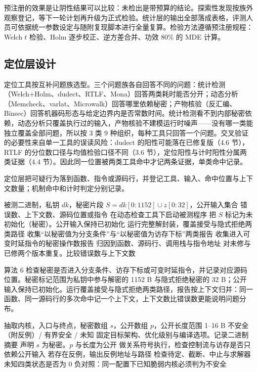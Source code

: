 预注册的效果是让阴性结果可以比较：未检出是带预算的结论。探索性发现按族外观察登记，等下一轮计划再升级为正式检验。统计层的输出全部落成表格，评测人员可依据统一参数设定与随附复现脚本进行全量复算。检验方法遵循预注册规程：Welch $t$ 检验、Holm 逐步校正、逆方差合并、功效 80\% 的 MDE 计算。

\subsection{定位层设计}

定位工具按互补问题族选型。三个问题族各自回答不同的问题：统计检测（Welch+Holm、dudect、RTLF、Mona）回答两类耗时能否分开；动态分析（Memcheck、varlat、Microwalk）回答哪里依赖秘密；产物核验（反汇编、Binsec）回答机器码形态与给定边界内是否常数时间。统计检测看不到内部秘密依赖，动态分析只覆盖执行过的输入，产物核验不建模运行时噪声——没有哪一类能独立覆盖全部问题，所以按 3 类 9 种组织，每种工具只回答一个问题。交叉验证的必要性来自单一工具的误读风险：dudect 的阳性可能落在已修复版（4.6 节），RTLF 的分位数口径与均值检验口径不同（3.6 节），定位阳性与计时阳性分属两类证据（4.4 节）。因此同一位置被两类工具命中才记两条证据，单类命中记录。

定位层把可疑行为落到函数、指令或源码行，并登记工具、输入、命中位置与上下文数量；机制命中和计时判定分别记录。

\begin{algorithm}[H]
\caption{秘密标记动态检查}
\label{alg:memcheck}
\begin{algorithmic}[1]
\Require 被测二进制，私钥 $dk$，秘密片段 $S=dk[0{:}1152]\cup z[0{:}32]$，公开输入集合
\Ensure 错误数、上下文数、源码位置或指令
\State 在动态检查工具下启动被测程序
\State 把 $S$ 标记为未初始化（秘密）。公开输入保持已初始化
\State 运行完整解封装，覆盖接受与隐式拒绝两类路径
\State 收集“以秘密值为分支条件”与“以秘密值为访存下标”两类报告
\State 收集进入可变时延指令的秘密操作数报告
\State 归因到函数、源码行、调用栈与指令地址
\State 对未修与已修两个版本重复。比较错误数与上下文数
\end{algorithmic}
\end{algorithm}

算法 6 检查秘密是否进入分支条件、访存下标或可变时延指令，并记录对应源码位置。秘密标记范围为私钥中参与解密的 1152 B 与隐式拒绝秘密的 32 B；公开输入保持已初始化。运行覆盖接受与隐式拒绝两类路径，报告按上下文归并：同一函数、同一源码行的多次命中记一个上下文，上下文数比错误数更能说明问题分布。

\begin{algorithm}[H]
\caption{Binsec 有界常数时间检查}
\label{alg:binsec}
\begin{algorithmic}[1]
\Require 抽取内核，入口与终点，秘密数组 $s$，公开数组 $p$，公开长度范围 1--16 B
\Ensure 不安全（附反例）/ 有界安全 / 未知
\State 固定目标架构、优化级别与编译选项。记录二进制摘要
\State 声明 $s$ 为秘密。$p$ 与长度为公开
\State 做关系符号执行，检查控制流与访存是否只依赖公开输入
\State 若存在反例，输出反例地址与路径
\State 检查待定、截断、中止与求解器未知四类状态是否为 0
\State 负对照：同一配置下已知脆弱内核必须判为不安全
\end{algorithmic}
\end{algorithm}

